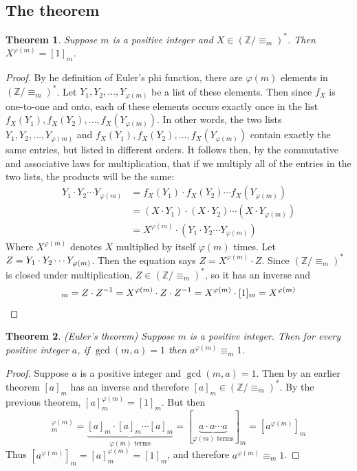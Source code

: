 \documentclass{report}
\newtheorem*{theorem}{Theorem}
\theoremstyle{definition}
\begin{document}
\subsection{The theorem}
\begin{theorem}
Suppose $m$ is a positive integer and $X\in(\mathbb Z/\equiv_m)^*$. Then $X^{\varphi(m)}=[1]_m$.
\end{theorem}
\begin{proof}
By he definition of Euler's phi function, there are $\varphi(m)$ elements in $(\mathbb Z/\equiv_m)^*$. Let $Y_1,Y_2,\ldots,Y_{\varphi(m)}$ be a list of these elements.
Then since $f_X$ is one-to-one and onto, each of these elements occurs exactly once in the list $f_X(Y_1),f_X(Y_2),\ldots,f_X(Y_{\varphi(m)})$. In other words, the two lists 
$Y_1,Y_2,\ldots,Y_{\varphi(m)}$ and $f_X(Y_1),f_X(Y_2),\ldots,f_X(Y_{\varphi(m)})$ contain exactly the same entries, but listed in different orders. It follows then, by the commutative and
associative laws for multiplication, that if we multiply all of the entries in the two lists, the products will be the same:
\begin{align*}
Y_1\cdot Y_2\cdots Y_{\varphi(m)}&=f_X(Y_1)\cdot f_X(Y_2)\cdots f_X(Y_{\varphi(m)})\\
&=(X\cdot Y_1)\cdot(X\cdot Y_2)\cdots(X\cdot Y_{\varphi(m)})\\
&=X^{\varphi(m)}\cdot(Y_1\cdot Y_2\cdots Y_{\varphi(m)})
\end{align*}
Where $X^{\varphi(m)}$ denotes $X$ multiplied by itself $\varphi(m)$ times. Let $Z=Y_1\cdot Y_2\cdots\\Y_{\varphi(m)}$. Then the equation says $Z=X^{\varphi(m)}\cdot Z$. 
Since $(\mathbb Z/\equiv_m)^*$ is closed under multiplication, $Z\in(\mathbb Z/\equiv_m)^*$, so it has an inverse and
\begin{equation*}
[1]_m=Z\cdot Z^{-1}=X^{\varphi(m)}\cdot Z\cdot Z^{-1}=X^{\varphi(m)}\cdot[1]_m=X^{\varphi(m)}\qedhere
\end{equation*}
\end{proof}
\begin{theorem}
(Euler's theorem) Suppose $m$ is a positive integer. Then for every positive integer $a$, if $\gcd(m,a)=1$ then $a^{\varphi(m)}\equiv_m1$.
\end{theorem}
\begin{proof}
Suppose $a$ is a positive integer and $\gcd(m,a)=1$. Then by an earlier theorem $[a]_m$ has an inverse and therefore $[a]_m\in(\mathbb Z/\equiv_m)^*$. By the previous theorem, 
$[a]_m^{\varphi(m)}=[1]_m$. But then
\begin{equation*}
[a]_m^{\varphi(m)}=\underbrace{[a]_m\cdot[a]_m\cdots[a]_m}_{\varphi(m)\text{ terms}}=[\underbrace{a\cdot a\cdots a}_{\varphi(m)\text{ terms}}]_m=[a^{\varphi(m)}]_m
\end{equation*}
Thus $[a^{\varphi(m)}]_m=[a]_m^{\varphi(m)}=[1]_m$, and therefore $a^{\varphi(m)}\equiv_m1$.
\end{proof}
\newpage
\end{document}
